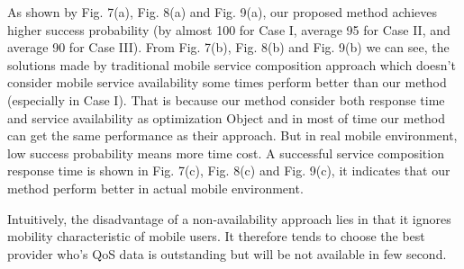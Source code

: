 \documentclass[10pt,journal,compsoc]{IEEEtran}
\begin{document}
As shown by Fig. 7(a), Fig. 8(a) and Fig. 9(a), our proposed method achieves higher success probability (by almost 100%
for Case I, average 95%
for Case II, and average 90%
for Case III). From Fig. 7(b), Fig. 8(b) and Fig. 9(b) we can see, the solutions made by traditional mobile service composition approach which doesn't consider mobile service availability some times perform better than our method (especially in Case I). That is because our method consider both response time and service availability as optimization Object and in most of time our method can get the same performance as their approach. But in real mobile environment, low success probability means more time cost. A successful service composition response time is shown in Fig. 7(c), Fig. 8(c) and Fig. 9(c), it indicates that our method perform better in actual mobile environment.

Intuitively, the disadvantage of a non-availability approach lies in that it ignores mobility characteristic of mobile users. It therefore tends to choose the best provider who's QoS data is outstanding but will be not available in few second.




\end{document}
